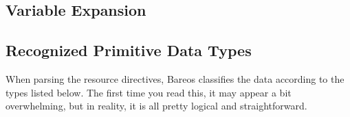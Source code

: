 \subsection{Variable Expansion}
    \label{VarsChapter}

\subsection{Recognized Primitive Data Types}
\label{DataTypes}

When parsing the resource directives, Bareos classifies the data according to
the types listed below. The first time you read this, it may appear a bit
overwhelming, but in reality, it is all pretty logical and straightforward.

